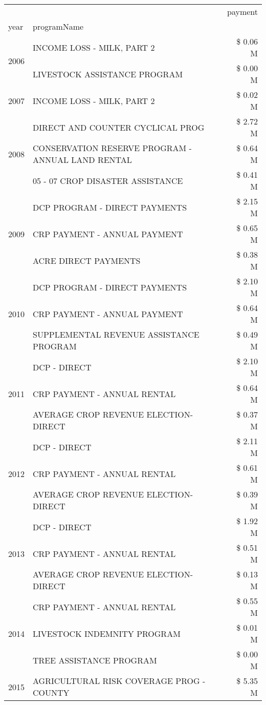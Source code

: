 \begin{tabular}{llr}
\toprule
 &  & payment \\
year & programName &  \\
\midrule
\multirow[t]{2}{*}{2006} & INCOME LOSS - MILK, PART 2 & \$ 0.06 M \\
 & LIVESTOCK ASSISTANCE PROGRAM & \$ 0.00 M \\
\cline{1-3}
2007 & INCOME LOSS - MILK, PART 2 & \$ 0.02 M \\
\cline{1-3}
\multirow[t]{3}{*}{2008} & DIRECT AND COUNTER CYCLICAL PROG & \$ 2.72 M \\
 & CONSERVATION RESERVE PROGRAM - ANNUAL LAND RENTAL & \$ 0.64 M \\
 & 05 - 07 CROP DISASTER ASSISTANCE & \$ 0.41 M \\
\cline{1-3}
\multirow[t]{3}{*}{2009} & DCP PROGRAM - DIRECT PAYMENTS & \$ 2.15 M \\
 & CRP PAYMENT - ANNUAL PAYMENT & \$ 0.65 M \\
 & ACRE DIRECT PAYMENTS & \$ 0.38 M \\
\cline{1-3}
\multirow[t]{3}{*}{2010} & DCP PROGRAM - DIRECT PAYMENTS & \$ 2.10 M \\
 & CRP PAYMENT - ANNUAL PAYMENT & \$ 0.64 M \\
 & SUPPLEMENTAL REVENUE ASSISTANCE PROGRAM & \$ 0.49 M \\
\cline{1-3}
\multirow[t]{3}{*}{2011} & DCP - DIRECT & \$ 2.10 M \\
 & CRP PAYMENT - ANNUAL RENTAL & \$ 0.64 M \\
 & AVERAGE CROP REVENUE ELECTION-DIRECT & \$ 0.37 M \\
\cline{1-3}
\multirow[t]{3}{*}{2012} & DCP - DIRECT & \$ 2.11 M \\
 & CRP PAYMENT - ANNUAL RENTAL & \$ 0.61 M \\
 & AVERAGE CROP REVENUE ELECTION-DIRECT & \$ 0.39 M \\
\cline{1-3}
\multirow[t]{3}{*}{2013} & DCP - DIRECT & \$ 1.92 M \\
 & CRP PAYMENT - ANNUAL RENTAL & \$ 0.51 M \\
 & AVERAGE CROP REVENUE ELECTION-DIRECT & \$ 0.13 M \\
\cline{1-3}
\multirow[t]{3}{*}{2014} & CRP PAYMENT - ANNUAL RENTAL & \$ 0.55 M \\
 & LIVESTOCK INDEMNITY PROGRAM & \$ 0.01 M \\
 & TREE ASSISTANCE PROGRAM & \$ 0.00 M \\
\cline{1-3}
\multirow[t]{3}{*}{2015} & AGRICULTURAL RISK COVERAGE PROG - COUNTY & \$ 5.35 M \\

\end{tabular}
